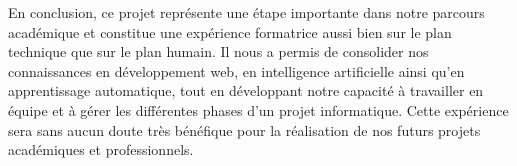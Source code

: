 En conclusion, ce projet représente une étape importante dans notre parcours académique et constitue une expérience formatrice aussi bien sur le plan technique que sur le plan humain. Il nous a permis de consolider nos connaissances en développement web, en intelligence artificielle ainsi qu’en apprentissage automatique, tout en développant notre capacité à travailler en équipe et à gérer les différentes phases d’un projet informatique. Cette expérience sera sans aucun doute très bénéfique pour la réalisation de nos futurs projets académiques et professionnels.